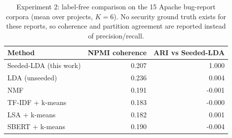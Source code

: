 \begin{table}
\caption{Experiment 2: label-free comparison on the 15 Apache bug-report corpora (mean over projects, $K=6$). No security ground truth exists for these reports, so coherence and partition agreement are reported instead of precision/recall.}
\label{tab:exp2baselines}
\begin{tabular}{lrr}
\toprule
Method & NPMI coherence & ARI vs Seeded-LDA \\
\midrule
Seeded-LDA (this work) & 0.207 & 1.000 \\
LDA (unseeded) & 0.236 & 0.004 \\
NMF & 0.191 & -0.001 \\
TF-IDF + k-means & 0.183 & -0.000 \\
LSA + k-means & 0.182 & 0.001 \\
SBERT + k-means & 0.190 & -0.004 \\
\bottomrule
\end{tabular}
\end{table}
